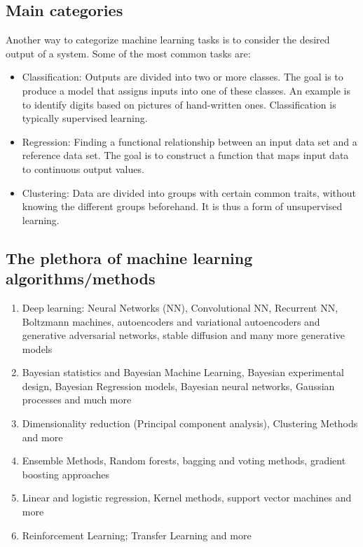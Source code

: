 \documentclass[%
oneside,                 %
final,                   %
10pt]{article}
\begin{document}
\subsection{Main categories}
\begin{block}{}
Another way to categorize machine learning tasks is to consider the desired output of a system.
Some of the most common tasks are:

\begin{itemize}
  \item Classification: Outputs are divided into two or more classes. The goal is to   produce a model that assigns inputs into one of these classes. An example is to identify  digits based on pictures of hand-written ones. Classification is typically supervised learning.

  \item Regression: Finding a functional relationship between an input data set and a reference data set.   The goal is to construct a function that maps input data to continuous output values.

  \item Clustering: Data are divided into groups with certain common traits, without knowing the different groups beforehand.  It is thus a form of unsupervised learning.
\end{itemize}

\noindent
\end{block}

\subsection{The plethora  of machine learning algorithms/methods}

\begin{enumerate}
\item Deep learning: Neural Networks (NN), Convolutional NN, Recurrent NN, Boltzmann machines, autoencoders and variational autoencoders  and generative adversarial networks, stable diffusion and many more generative models

\item Bayesian statistics and Bayesian Machine Learning, Bayesian experimental design, Bayesian Regression models, Bayesian neural networks, Gaussian processes and much more

\item Dimensionality reduction (Principal component analysis), Clustering Methods and more

\item Ensemble Methods, Random forests, bagging and voting methods, gradient boosting approaches 

\item Linear and logistic regression, Kernel methods, support vector machines and more

\item Reinforcement Learning; Transfer Learning and more 
\end{enumerate}
\end{document}
